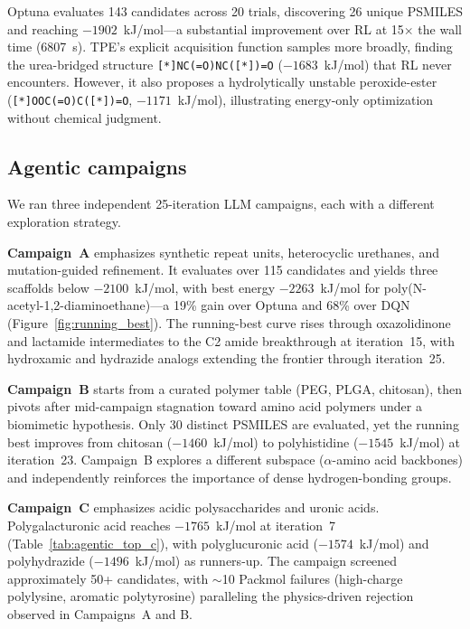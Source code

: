 \documentclass[twocolumn]{fairmeta}
\begin{document}
Optuna evaluates 143 candidates across 20 trials, discovering 26 unique PSMILES and reaching $-1902$~kJ/mol---a substantial improvement over RL at 15$\times$ the wall time (6807~s).
TPE's explicit acquisition function samples more broadly, finding the urea-bridged structure \texttt{[*]NC(=O)NC([*])=O} ($-1683$~kJ/mol) that RL never encounters.
However, it also proposes a hydrolytically unstable peroxide-ester (\texttt{[*]OOC(=O)C([*])=O}, $-1171$~kJ/mol), illustrating energy-only optimization without chemical judgment.

\subsection{Agentic campaigns}

We ran three independent 25-iteration LLM campaigns, each with a different exploration strategy.

\textbf{Campaign~A} emphasizes synthetic repeat units, heterocyclic urethanes, and mutation-guided refinement.
It evaluates over 115 candidates and yields three scaffolds below $-2100$~kJ/mol, with best energy $-2263$~kJ/mol for poly(N-acetyl-1,2-diaminoethane)---a 19\% gain over Optuna and 68\% over DQN (Figure~\ref{fig:running_best}).
The running-best curve rises through oxazolidinone and lactamide intermediates to the C2 amide breakthrough at iteration~15, with hydroxamic and hydrazide analogs extending the frontier through iteration~25.

\textbf{Campaign~B} starts from a curated polymer table (PEG, PLGA, chitosan), then pivots after mid-campaign stagnation toward amino acid polymers under a biomimetic hypothesis.
Only 30 distinct PSMILES are evaluated, yet the running best improves from chitosan ($-1460$~kJ/mol) to polyhistidine ($-1545$~kJ/mol) at iteration~23.
Campaign~B explores a different subspace ($\alpha$-amino acid backbones) and independently reinforces the importance of dense hydrogen-bonding groups.

\textbf{Campaign~C} emphasizes acidic polysaccharides and uronic acids.
Polygalacturonic acid reaches $-1765$~kJ/mol at iteration~7 (Table~\ref{tab:agentic_top_c}), with polyglucuronic acid ($-1574$~kJ/mol) and polyhydrazide ($-1496$~kJ/mol) as runners-up.
The campaign screened approximately 50+ candidates, with ${\sim}$10 Packmol failures (high-charge polylysine, aromatic polytyrosine) paralleling the physics-driven rejection observed in Campaigns~A and B.
\end{document}
